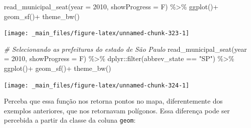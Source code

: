 \documentclass[
  brazilian,
]{book}
\newenvironment{Shaded}{\begin{snugshade}}{\end{snugshade}}
\newcommand{\AttributeTok}[1]{\textcolor[rgb]{0.77,0.63,0.00}{#1}}
\newcommand{\CommentTok}[1]{\textcolor[rgb]{0.56,0.35,0.01}{\textit{#1}}}
\newcommand{\DecValTok}[1]{\textcolor[rgb]{0.00,0.00,0.81}{#1}}
\newcommand{\FunctionTok}[1]{\textcolor[rgb]{0.00,0.00,0.00}{#1}}
\newcommand{\NormalTok}[1]{#1}
\newcommand{\OtherTok}[1]{\textcolor[rgb]{0.56,0.35,0.01}{#1}}
\newcommand{\SpecialCharTok}[1]{\textcolor[rgb]{0.00,0.00,0.00}{#1}}
\newcommand{\StringTok}[1]{\textcolor[rgb]{0.31,0.60,0.02}{#1}}
\begin{document}
\begin{Shaded}
\begin{Highlighting}[]
\FunctionTok{read\_municipal\_seat}\NormalTok{(}\AttributeTok{year =} \DecValTok{2010}\NormalTok{,}
                    \AttributeTok{showProgress =}\NormalTok{ F) }\SpecialCharTok{\%\textgreater{}\%}
  \FunctionTok{ggplot}\NormalTok{()}\SpecialCharTok{+}
  \FunctionTok{geom\_sf}\NormalTok{()}\SpecialCharTok{+}
  \FunctionTok{theme\_bw}\NormalTok{()}
\end{Highlighting}
\end{Shaded}

\begin{center}\texttt{[image: \_main\_files/figure-latex/unnamed-chunk-323-1]} \end{center}

\begin{Shaded}
\begin{Highlighting}[]
\CommentTok{\# Selecionando as prefeituras do estado de São Paulo}
\FunctionTok{read\_municipal\_seat}\NormalTok{(}\AttributeTok{year =} \DecValTok{2010}\NormalTok{,}
                    \AttributeTok{showProgress =}\NormalTok{ F) }\SpecialCharTok{\%\textgreater{}\%} 
\NormalTok{  dplyr}\SpecialCharTok{::}\FunctionTok{filter}\NormalTok{(abbrev\_state }\SpecialCharTok{==} \StringTok{"SP"}\NormalTok{) }\SpecialCharTok{\%\textgreater{}\%} 
  \FunctionTok{ggplot}\NormalTok{()}\SpecialCharTok{+}
  \FunctionTok{geom\_sf}\NormalTok{()}\SpecialCharTok{+}
  \FunctionTok{theme\_bw}\NormalTok{()}
\end{Highlighting}
\end{Shaded}

\begin{center}\texttt{[image: \_main\_files/figure-latex/unnamed-chunk-324-1]} \end{center}

Perceba que essa função nos retorna pontos no mapa, diferentemente dos exemplos anteriores, que nos retornavam polígonos. Essa diferença pode ser percebida a partir da classe da coluna \texttt{geom}:

\begin{Shaded}
\end{Shaded}
\end{document}
